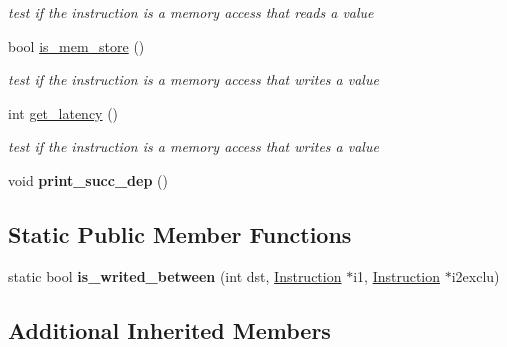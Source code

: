 \begin{DoxyCompactItemize}
\begin{DoxyCompactList}\small\item\em test if the instruction is a memory access that reads a value \end{DoxyCompactList}\item 
\hypertarget{class_instruction_a4455144397d239eb61bcfa2b0e16bf67}{bool \hyperlink{class_instruction_a4455144397d239eb61bcfa2b0e16bf67}{is\-\_\-mem\-\_\-store} ()}\label{class_instruction_a4455144397d239eb61bcfa2b0e16bf67}

\begin{DoxyCompactList}\small\item\em test if the instruction is a memory access that writes a value \end{DoxyCompactList}\item 
\hypertarget{class_instruction_ac2988d2fb858b720e009da03120ae4c7}{int \hyperlink{class_instruction_ac2988d2fb858b720e009da03120ae4c7}{get\-\_\-latency} ()}\label{class_instruction_ac2988d2fb858b720e009da03120ae4c7}

\begin{DoxyCompactList}\small\item\em test if the instruction is a memory access that writes a value \end{DoxyCompactList}\item 
\hypertarget{class_instruction_af489e680ae3c69fd12b0a23e959172e5}{void {\bfseries print\-\_\-succ\-\_\-dep} ()}\label{class_instruction_af489e680ae3c69fd12b0a23e959172e5}

\end{DoxyCompactItemize}
\subsection*{Static Public Member Functions}
\begin{DoxyCompactItemize}
\item 
\hypertarget{class_instruction_ae309ff37d134500f75e1180182b02a6b}{static bool {\bfseries is\-\_\-writed\-\_\-between} (int dst, \hyperlink{class_instruction}{Instruction} $\ast$i1, \hyperlink{class_instruction}{Instruction} $\ast$i2exclu)}\label{class_instruction_ae309ff37d134500f75e1180182b02a6b}

\end{DoxyCompactItemize}
\subsection*{Additional Inherited Members}


